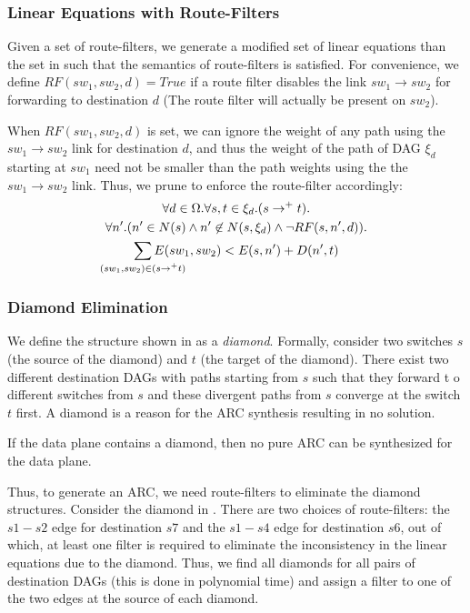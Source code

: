 \subsubsection{Linear Equations with Route-Filters}
Given a set of route-filters, we generate a modified 
set of linear equations than the set in 
such that the semantics of route-filters is satisfied. 
For convenience, we define $RF(sw_1, sw_2, d) = True$ 
if a route filter disables the link $sw_1 \rightarrow sw_2$
for forwarding to destination $d$ (The route filter will
actually be present on $sw_2$). 

When $RF(sw_1, sw_2, d)$ is set, we can ignore the 
weight of any path using the $sw_1 \rightarrow sw_2$
link for destination $d$, and thus 
the weight of the path of DAG $\xi_d$
starting at $sw_1$ need not be smaller than the path weights
using the the $sw_1 \rightarrow sw_2$ link. Thus,
we prune  to enforce the route-filter accordingly:
\begin{multline} \label{eq:uniq}
		\forall d \in \Omega. \forall s, t \in \xi_d. (s \rightarrow^+ t).\\ 
		\forall n'. (n' \in N(s) \wedge n' \not\in N(s, \xi_d) \wedge \neg RF(s,n',d)). \\
		\sum_{\mathclap{\substack{(sw_1, sw_2) \in (s \rightarrow^+ t)}}} 
		E(sw_1, sw_2) < E(s, n') + D(n', t)   
\end{multline}

\subsubsection{Diamond Elimination}
We define the structure shown in 
as a \emph{diamond}. Formally,
consider two switches $s$ (the source of the diamond) 
and $t$ (the target of the diamond).
There exist two different destination DAGs with 
paths starting from $s$ such that they forward t
o different switches from $s$  
and these divergent paths from $s$ converge
at the switch $t$ first. A diamond is 
a reason for the ARC synthesis resulting in no
solution. 
\begin{theorem} \label{thm:diamond}
If the data plane contains a diamond, then no pure ARC  
can be synthesized for the data plane.
\end{theorem}
Thus, to generate an ARC, we need route-filters
to eliminate the diamond structures. Consider
the diamond in . There are two choices
of route-filters: the $s1-s2$ edge for destination $s7$ 
and the $s1-s4$ edge for destination $s6$, out of which,
at least one filter is required to eliminate the 
inconsistency in the linear equations due to the diamond.
Thus, we find all diamonds for all pairs of destination
DAGs (this is done in polynomial time) and assign a filter
to one of the two edges at the source of each diamond. 

